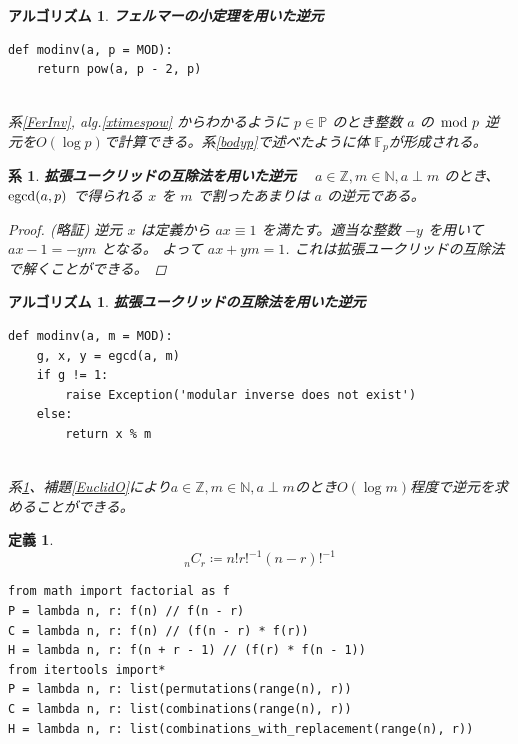 \documentclass[12pt, a4j]{ltjsarticle}
\newtheorem{defi}[thm]{定義}
\newtheorem{cor}[thm]{系}
\newtheorem{alg}[thm]{アルゴリズム}
\newcommand*{\NN}{\mathbb{N}}
\newcommand*{\ZZ}{\mathbb{Z}}
\begin{document}
\vspace{1cm}

\begin{alg} {\bf フェルマーの小定理を用いた逆元}　\\ \upshape
\begin{lstlisting}
def modinv(a, p = MOD):
    return pow(a, p - 2, p)
\end{lstlisting}
\quad\\	\itshape
系\ref{FerInv}, alg.\ref{xtimespow} からわかるように $p\in\mathbb{P}$ のとき整数 $a$ の $\hspace{-2mm}\mod p$ 逆元を$O(\log p)$で計算できる。系\ref{bodyp}で述べたように体 $\mathbb{F}_p$が形成される。
\end{alg}

\vspace{1cm}

\begin{cor} {\bf 拡張ユークリッドの互除法を用いた逆元}\label{egcdinv}　
$a\in\ZZ, m\in\NN, a \perp m$ のとき、${\rm egcd}(a, p)$ で得られる $x$ を $m$ で割ったあまりは $a$ の逆元である。
\begin{proof}(略証)
逆元 $x$ は定義から $ax\equiv 1$ を満たす。適当な整数 $-y$ を用いて $ax-1=-ym$ となる。 よって $ax+ym=1$. これは拡張ユークリッドの互除法で解くことができる。
\end{proof}
\end{cor}

\vspace{1cm}

\begin{alg}{\bf 拡張ユークリッドの互除法を用いた逆元}　\\ \upshape
\begin{lstlisting}
def modinv(a, m = MOD):
    g, x, y = egcd(a, m)
    if g != 1:
        raise Exception('modular inverse does not exist')
    else:
        return x % m
\end{lstlisting}
\quad\\	\itshape
系\ref{egcdinv}、補題\ref{EuclidO}により$a\in\ZZ, m\in\NN, a \perp m$のとき$O(\log m)$程度で逆元を求めることができる。
\end{alg}

\vspace{1cm}

\begin{defi}
\begin{equation}
{}_nC_r \coloneqq n!r!^{-1}(n-r)!^{-1}
\end{equation}
\end{defi}
\begin{lstlisting}
from math import factorial as f
P = lambda n, r: f(n) // f(n - r)
C = lambda n, r: f(n) // (f(n - r) * f(r))
H = lambda n, r: f(n + r - 1) // (f(r) * f(n - 1))
from itertools import*
P = lambda n, r: list(permutations(range(n), r))
C = lambda n, r: list(combinations(range(n), r))
H = lambda n, r: list(combinations_with_replacement(range(n), r))
\end{lstlisting}
\end{document}
